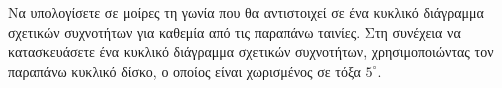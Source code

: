 \begin{alist}
    \item Να υπολογίσετε σε μοίρες τη γωνία που θα αντιστοιχεί σε ένα κυκλικό διάγραμμα σχετικών συχνοτήτων για καθεμία από τις παραπάνω ταινίες. Στη συνέχεια να κατασκευάσετε ένα κυκλικό διάγραμμα σχετικών συχνοτήτων, χρησιμοποιώντας τον παραπάνω κυκλικό δίσκο, ο οποίος είναι χωρισμένος σε τόξα $5^\circ$.
\end{alist}

